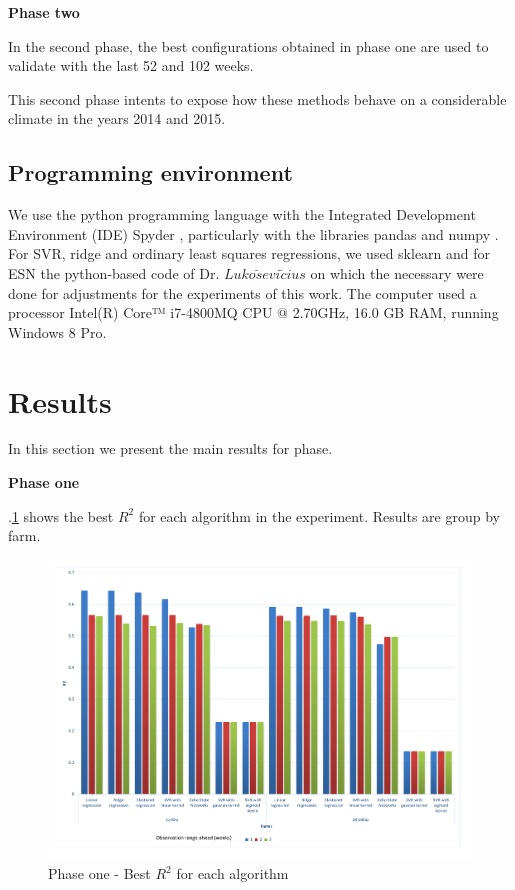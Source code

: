 \documentclass[review]{elsarticle}
\begin{document}
{\bf Phase two }	

In the second phase, the best configurations obtained in phase one are used to validate with the last 52 and 102 weeks. 

This second phase intents to expose how these methods behave on a considerable climate in the years 2014 and 2015.

\subsection{Programming environment}

We use the python programming language with the Integrated Development Environment (IDE) Spyder \citep{Continuum2015}, particularly with the libraries pandas \citep{mckinneypandas2010} and numpy \citep{vanderWalt2011}. For SVR, ridge and ordinary least squares regressions, we used sklearn \citep{scikitlearn2011} and for ESN the python-based code of Dr. $Luko\breve{s} evi \breve{c} ius$ \citep{Lukose2012} on which the necessary were done for adjustments for the experiments of this work. The computer used a processor Intel(R) Core™ i7-4800MQ CPU @ 2.70GHz, 16.0 GB RAM, running Windows 8 Pro.

\section{Results}

In this section we present the main results for phase.

{\bf Phase one } 

\figurename $.$\ref{figura4} shows the best $R^2$ for each algorithm in the experiment. Results are group by farm.

\begin{figure}[H] 
 \centering
 \includegraphics[scale=.5]{Phase_one_Best_R2_for_each_algortihm}
 \caption{Phase one - Best $R^2$ for each algorithm} 
 \label{figura4} 
\end{figure}
\end{document}

